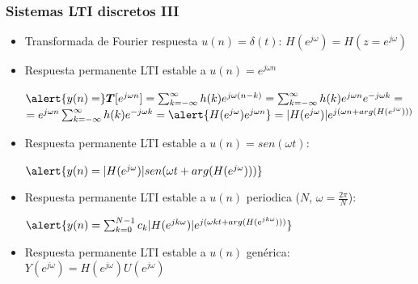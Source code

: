 
\begin{frame}
\frametitle{Sistemas LTI discretos III}


\small


\begin{figure}\centering\small
  \end{figure}
  \begin{itemize}\footnotesize
    \item Transformada  de Fourier respuesta $u(n)=\delta(t)$: $H(e^{j\omega})=H(z=e^{j\omega})$
    \item Respuesta permanente LTI estable a $u(n)=e^{j\omega n}$\footnotesize

    $\alert{y(n)=}\bm{T}[e^{j\omega n}]=\sum_{k=-\infty}^\infty h(k)e^{j\omega(n-k)}=\sum_{k=-\infty}^\infty h(k)e^{j\omega n}e^{-j\omega k}=$
    \hspace{0.6cm}	$=e^{j\omega n} \sum_{k=-\infty}^\infty h(k)e^{-j\omega k}=\alert{H(e^{j\omega})e^{j\omega n}}=|H(e^{j\omega})|e^{j(\omega n+arg(H(e^{j\omega})))}$
    \item Respuesta permanente LTI estable a $u(n)=sen(\omega t)$:

    $\alert{y(n)=|H(e^{j\omega})|sen(\omega t+arg(H(e^{j\omega})))}$
    \item Respuesta permanente LTI estable a $u(n)$ periodica ($N$, $\omega=\frac{2\pi}{N}$):

    $\alert{y(n)=\sum_{k=0}^{N-1} c_k |H(e^{jk\omega})|e^{j(\omega kt+arg(H(e^{jk\omega})))}}$
    \item Respuesta permanente  LTI estable a $u(n)$ gen\'{e}rica: $Y(e^{j\omega})=H(e^{j\omega})U(e^{j\omega})$
  \end{itemize}
\end{frame}



